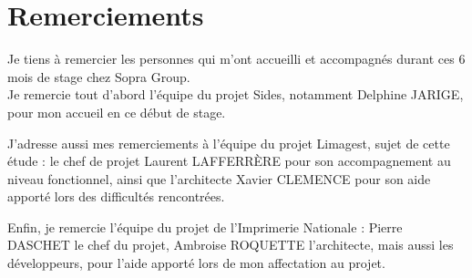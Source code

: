 \cleardoublepage

\chapter*{Remerciements}




Je tiens à remercier les personnes qui m'ont accueilli et accompagnés durant ces 6 mois de stage chez Sopra Group.
\\

Je remercie tout d'abord l'équipe du projet Sides, notamment Delphine JARIGE, pour mon accueil en ce début de stage.

J'adresse aussi mes remerciements à l'équipe du projet Limagest, sujet de cette étude : le chef de projet Laurent LAFFERRÈRE pour son accompagnement au niveau fonctionnel, ainsi que l'architecte Xavier CLEMENCE pour son aide apporté lors des difficultés rencontrées.

Enfin, je remercie l'équipe du projet de l'Imprimerie Nationale : Pierre DASCHET le chef du projet, Ambroise ROQUETTE l'architecte, mais aussi les développeurs, pour l'aide apporté lors de mon affectation au projet.